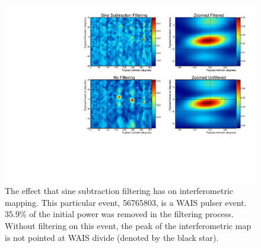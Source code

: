 \begin{figure}
	\centering
	\includegraphics[height=0.5\textheight]{figures/SineSubtractMaps}
	\caption{The effect that sine subtraction filtering has on interferometric mapping.  This particular event, 56765803, is a WAIS pulser event.  35.9\% of the initial power was removed in the filtering process.  Without filtering on this event, the peak of the interferometric map is not pointed at WAIS divide (denoted by the black star).} 
	\label{fig:SineSubtractMaps}
\end{figure}

